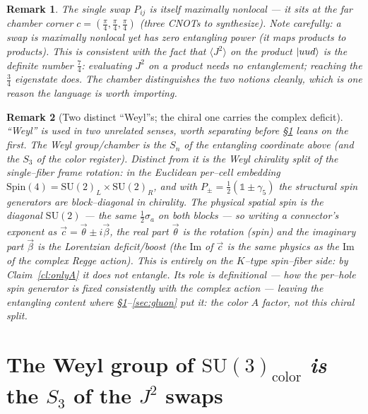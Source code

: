 \documentclass[11pt,oneside]{article}
\newcommand{\halff}{\tfrac{1}{2}}
\newcommand{\id}{\mathbb{1}}
\newcommand{\expval}[1]{\langle #1 \rangle}
\newcommand{\SU}{\mathrm{SU}}
\newcommand{\Spin}{\mathrm{Spin}}
\theoremstyle{plain}
\newtheorem{remark}{Remark}
\begin{document}
\begin{remark}
The single swap $P_{ij}$ is itself \emph{maximally nonlocal} --- it sits at the
far chamber corner $c=(\tfrac\pi4,\tfrac\pi4,\tfrac\pi4)$ (three CNOTs to
synthesize). Note carefully: a swap is maximally nonlocal yet has zero
\emph{entangling power} (it maps products to products). This is consistent with
the fact that $\expval{J^2}$ on the product $\ket{uud}$ is the definite number
$\tfrac74$: evaluating $J^2$ on a product needs no entanglement; reaching the
$\tfrac34$ \emph{eigenstate} does. The chamber distinguishes the two notions
cleanly, which is one reason the language is worth importing.
\end{remark}

\begin{remark}[Two distinct ``Weyl''s; the chiral one carries the complex deficit]
``Weyl'' is used in two unrelated senses, worth separating before
\S\ref{sec:weyl} leans on the first. The Weyl \emph{group}/chamber is the $S_n$ of
the entangling coordinate above (and the $S_3$ of the color register). Distinct
from it is the Weyl \emph{chirality} split of the \emph{single--fiber} frame
rotation: in the Euclidean per--cell embedding $\Spin(4)=\SU(2)_L\times\SU(2)_R$,
and with $P_\pm=\halff(\id\pm\gamma_5)$ the structural spin generators are
block--diagonal in chirality. The \emph{physical} spatial spin is the
\emph{diagonal} $\SU(2)$ --- the same $\halff\sigma_a$ on both blocks --- so
writing a connector's exponent as $\vec c=\vec\theta\pm i\vec\beta$, the real part
$\vec\theta$ is the rotation (spin) and the imaginary part $\vec\beta$ is the
Lorentzian deficit/boost (the $\mathrm{Im}$ of $\vec c$ is the same physics as the
$\mathrm{Im}$ of the complex Regge action). This is entirely on the $K$--type
spin--fiber side: by Claim~\ref{cl:onlyA} it does \emph{not} entangle. Its role is
definitional --- how the per--hole spin generator is fixed consistently with the
complex action --- leaving the entangling content where
\S\ref{sec:weyl}--\ref{sec:gluon} put it: the color $A$ factor, not this chiral
split.
\end{remark}

\section{The Weyl group of $\SU(3)_{\text{color}}$ \emph{is} the $S_3$ of the
$J^2$ swaps}
\label{sec:weyl}
\end{document}
